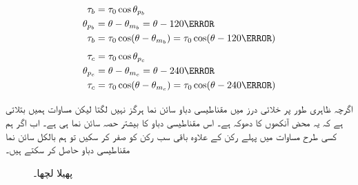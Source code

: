 \begin{gather}
\begin{aligned}\label{مساوات_گھومتے_مشین_ب_موج}
\tau_b&=\tau_0 \cos \theta_{p_b}\\
\theta_{p_b}&=\theta-\theta_{m_b}=\theta-120\degree\\
\tau_b&=\tau_0 \cos (\theta-\theta_{m_b})=\tau_0 \cos (\theta-120\degree)
\end{aligned}
\end{gather}
%
\begin{gather}
\begin{aligned}\label{مساوات_گھومتے_مشین_پ_موج}
\tau_c&=\tau_0 \cos \theta_{p_c}\\
\theta_{p_c}&=\theta-\theta_{m_c}=\theta-240\degree\\
\tau_c&=\tau_0 \cos (\theta-\theta_{m_c})=\tau_0 \cos (\theta-240\degree)
\end{aligned}
\end{gather}

اگرچہ ظاہری طور پر خلائی درز میں مقناطیسی دباو سائن نما ہرگز نہیں لگتا لیکن مساوات   ہمیں بتلاتی ہے کہ یہ محض آنکھوں کا دھوکہ ہے۔ اس مقناطیسی دباو کا بیشتر حصہ سائن نما ہی ہے۔  اب اگر ہم کسی طرح مساوات    میں پہلے رکن کے علاوہ باقی سب رکن کو صفر کر سکیں تو ہم بالکل  سائن نما مقناطیسی دباو حاصل کر سکتے ہیں۔
\begin{figure}
\centering
%
\caption{پھیلا لچھا۔}
\label{شکل_گھومتے_مشین_پھیلا_لچھا}
\end{figure}


